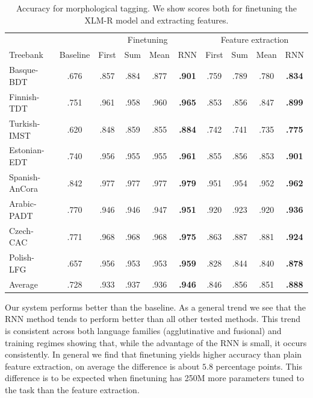 \documentclass[11pt]{article}
\begin{document}
    \begin{table}%
	\centering
	\begin{tabular}{l|c|cccc|cccc}
		& & \multicolumn{4}{c}{Finetuning} & \multicolumn{4}{c}{Feature extraction} \\
		Treebank & Baseline & First & Sum & Mean & RNN & First & Sum & Mean & RNN \\
		\hline
		Basque-BDT      & .676 & .857 & .884 & .877 & \textbf{.901} & .759 & .789 & .780 & \textbf{.834} \\
		Finnish-TDT     & .751 & .961 & .958 & .960 & \textbf{.965} & .853 & .856 & .847 & \textbf{.899} \\
		Turkish-IMST    & .620 & .848 & .859 & .855 & \textbf{.884} & .742 & .741 & .735 & \textbf{.775} \\
		Estonian-EDT    & .740 & .956 & .955 & .955 & \textbf{.961} & .855 & .856 & .853 & \textbf{.901} \\
		Spanish-AnCora  & .842 & .977 & .977 & .977 & \textbf{.979} & .951 & .954 & .952 & \textbf{.962} \\
		Arabic-PADT     & .770 & .946 & .946 & .947 & \textbf{.951} & .920 & .923 & .920 & \textbf{.936} \\
		Czech-CAC       & .771 & .968 & .968 & .968 & \textbf{.975} & .863 & .887 & .881 & \textbf{.924} \\
		Polish-LFG      & .657 & .956 & .953 & .953 & \textbf{.959} & .828 & .844 & .840 & \textbf{.878} \\
        \hline
        Average         & .728 & .933 & .937 & .936 & \textbf{.946} & .846 & .856 & .851 & \textbf{.888} \\
	\end{tabular}
    	\caption{\label{tab:results_tokens} Accuracy for morphological
          tagging. We show scores both for finetuning the XLM-R model and
          extracting features.}
    \end{table}


                Our system performs better than the baseline. As a
     general trend we see that the RNN method tends to perform better
     than all other tested methods. This trend is consistent across
     both language families (agglutinative and fusional) and
     training regimes showing that, while the advantage of the RNN is
     small, it occurs consistently.
            In general we find that finetuning yields higher accuracy
     than plain feature extraction, on average the difference is about
     $5.8$ percentage points.  This difference is to be expected when
     finetuning has 250M more parameters tuned to the task than the
     feature extraction.
    
\end{document}
